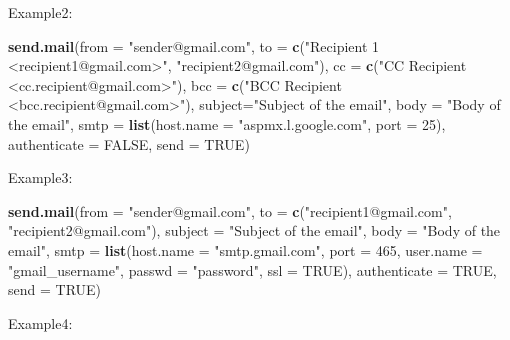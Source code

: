 \documentclass[]{book}
\newenvironment{Shaded}{\begin{snugshade}}{\end{snugshade}}
\newcommand{\KeywordTok}[1]{\textcolor[rgb]{0.13,0.29,0.53}{\textbf{#1}}}
\newcommand{\DataTypeTok}[1]{\textcolor[rgb]{0.13,0.29,0.53}{#1}}
\newcommand{\DecValTok}[1]{\textcolor[rgb]{0.00,0.00,0.81}{#1}}
\newcommand{\StringTok}[1]{\textcolor[rgb]{0.31,0.60,0.02}{#1}}
\newcommand{\OtherTok}[1]{\textcolor[rgb]{0.56,0.35,0.01}{#1}}
\newcommand{\NormalTok}[1]{#1}
\begin{document}
Example2:

\begin{Shaded}
\begin{Highlighting}[]
\KeywordTok{send.mail}\NormalTok{(}\DataTypeTok{from =} \StringTok{"sender@gmail.com"}\NormalTok{,}
          \DataTypeTok{to =} \KeywordTok{c}\NormalTok{(}\StringTok{"Recipient 1 <recipient1@gmail.com>"}\NormalTok{, }\StringTok{"recipient2@gmail.com"}\NormalTok{),}
          \DataTypeTok{cc =} \KeywordTok{c}\NormalTok{(}\StringTok{"CC Recipient <cc.recipient@gmail.com>"}\NormalTok{),}
          \DataTypeTok{bcc =} \KeywordTok{c}\NormalTok{(}\StringTok{"BCC Recipient <bcc.recipient@gmail.com>"}\NormalTok{),}
          \DataTypeTok{subject=}\StringTok{"Subject of the email"}\NormalTok{,}
          \DataTypeTok{body =} \StringTok{"Body of the email"}\NormalTok{,}
          \DataTypeTok{smtp =} \KeywordTok{list}\NormalTok{(}\DataTypeTok{host.name =} \StringTok{"aspmx.l.google.com"}\NormalTok{, }\DataTypeTok{port =} \DecValTok{25}\NormalTok{),}
          \DataTypeTok{authenticate =} \OtherTok{FALSE}\NormalTok{,}
          \DataTypeTok{send =} \OtherTok{TRUE}\NormalTok{)}
\end{Highlighting}
\end{Shaded}

Example3:

\begin{Shaded}
\begin{Highlighting}[]
\KeywordTok{send.mail}\NormalTok{(}\DataTypeTok{from =} \StringTok{"sender@gmail.com"}\NormalTok{,}
          \DataTypeTok{to =} \KeywordTok{c}\NormalTok{(}\StringTok{"recipient1@gmail.com"}\NormalTok{, }\StringTok{"recipient2@gmail.com"}\NormalTok{),}
          \DataTypeTok{subject =} \StringTok{"Subject of the email"}\NormalTok{,}
          \DataTypeTok{body =} \StringTok{"Body of the email"}\NormalTok{,}
          \DataTypeTok{smtp =} \KeywordTok{list}\NormalTok{(}\DataTypeTok{host.name =} \StringTok{"smtp.gmail.com"}\NormalTok{, }\DataTypeTok{port =} \DecValTok{465}\NormalTok{, }\DataTypeTok{user.name =} \StringTok{"gmail_username"}\NormalTok{, }\DataTypeTok{passwd =} \StringTok{"password"}\NormalTok{, }\DataTypeTok{ssl =} \OtherTok{TRUE}\NormalTok{),}
          \DataTypeTok{authenticate =} \OtherTok{TRUE}\NormalTok{,}
          \DataTypeTok{send =} \OtherTok{TRUE}\NormalTok{)}
\end{Highlighting}
\end{Shaded}

Example4:
\end{document}
